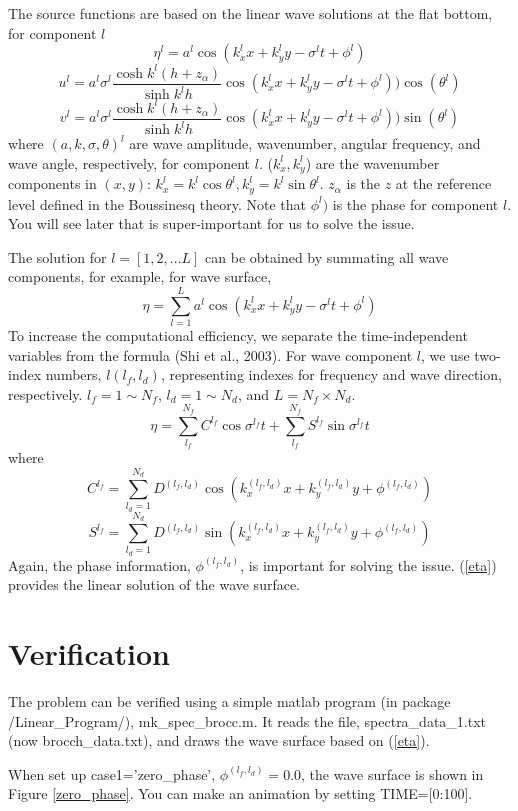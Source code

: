 \documentclass[preprint,10pt]{elsarticle}
\newcommand{\be}{\begin{equation}}
\newcommand{\ee}{\end{equation}}
\begin{document}
 The source functions are based on the linear wave solutions at the flat bottom, for component $l$
 \be
 \eta^l = a^l \cos(k_x^l x + k_y^l y - \sigma^l t + \phi^l)
 \ee
 \be
 u^l = a^l \sigma^l \frac{\cosh k^l(h+z_\alpha)}{\sinh k^l h} \cos(k_x^l x + k_y^l y - \sigma^l t + \phi^l))\cos(\theta^l)
 \ee
  \be
 v^l = a^l \sigma^l \frac{\cosh k^l(h+z_\alpha)}{\sinh k^l h} \cos(k_x^l x + k_y^l y - \sigma^l t + \phi^l))\sin(\theta^l)
 \ee
 where $(a, k, \sigma, \theta)^l$ are wave amplitude, wavenumber, angular frequency, and wave angle, respectively, for component $l$. ($k^l_x,k^l_y$) are the wavenumber components in $(x,y)$:  $k^l_x = k^l \cos\theta^l, k^l_y = k^l \sin \theta^l$.  $z_\alpha$ is the $z$ at the reference level defined in the Boussinesq theory.  Note that $\phi^l)$ is the phase for component $l$. You will see later that is super-important for us to solve the issue. 
 
 The solution for $l=[1,2,... L]$ can be obtained by summating all wave components, for example, for wave surface,
 \be
 \eta = \sum_{l=1}^{L}  a^l \cos(k_x^l x + k_y^l y - \sigma^l t + \phi^l)
 \ee
 To increase the computational efficiency, we separate the time-independent variables from the formula (Shi et al., 2003). For wave component $l$,  we use two-index numbers, $l(l_f, l_d)$, representing indexes for frequency and wave direction, respectively. $l_f = 1 \sim N_f$, $l_d = 1 \sim N_d$, and $L = N_f \times N_d$.
 \be
  \eta = \sum_{l_f}^{N_f} C^{l_f} \cos \sigma^{l_f} t + \sum_{l_f}^{N_f} S^{l_f} \sin \sigma^{l_f} t
  \label{eta}
 \ee
 where
 \be
 C^{l_f} = \sum_{l_d=1}^{N_d} D^{(l_f,l_d)} \cos\left(k_x^{(l_f,l_d)}  x +k_y^{(l_f,l_d)}  y +\phi^{(l_f,l_d)}\right )
 \ee
  \be
 S^{l_f} = \sum_{l_d=1}^{N_d} D^{(l_f,l_d)} \sin\left(k_x^{(l_f,l_d)}  x +k_y^{(l_f,l_d)}  y +\phi^{(l_f,l_d)}\right )
 \ee
 Again, the phase information, $\phi^{(l_f,l_d)}$, is important for solving the issue. (\ref{eta}) provides the linear solution of the wave surface. 
 
 \section{Verification}
 The problem can be verified using a simple matlab program (in package /Linear\_Program/), mk\_spec\_brocc.m. It reads the file, spectra\_data\_1.txt (now brocch\_data.txt), and draws the wave surface based on (\ref{eta}). 
 
 When set up case1='zero\_phase', $\phi^{(l_f,l_d)} = 0.0$, the wave surface is shown in Figure \ref{zero_phase}. You can make an animation by setting TIME=[0:100]. 
 
\end{document}
